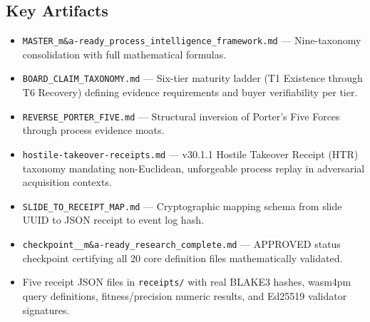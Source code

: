 \subsection{Key Artifacts}
\label{sec:ma-identity-artifacts}

\begin{itemize}
  \item \texttt{MASTER\_m\&a-ready\_process\_intelligence\_framework.md} --- Nine-taxonomy
    consolidation with full mathematical formulas.
  \item \texttt{BOARD\_CLAIM\_TAXONOMY.md} --- Six-tier maturity ladder (T1 Existence through
    T6 Recovery) defining evidence requirements and buyer verifiability per tier.
  \item \texttt{REVERSE\_PORTER\_FIVE.md} --- Structural inversion of Porter's Five Forces
    through process evidence moats.
  \item \texttt{hostile-takeover-receipts.md} --- v30.1.1 Hostile Takeover Receipt (HTR)
    taxonomy mandating non-Euclidean, unforgeable process replay in adversarial acquisition
    contexts.
  \item \texttt{SLIDE\_TO\_RECEIPT\_MAP.md} --- Cryptographic mapping schema from slide UUID to
    JSON receipt to event log hash.
  \item \texttt{checkpoint\_\_m\&a-ready\_research\_complete.md} --- APPROVED status checkpoint
    certifying all 20 core definition files mathematically validated.
  \item Five receipt JSON files in \texttt{receipts/} with real BLAKE3 hashes, wasm4pm query
    definitions, fitness/precision numeric results, and Ed25519 validator signatures.
\end{itemize}
